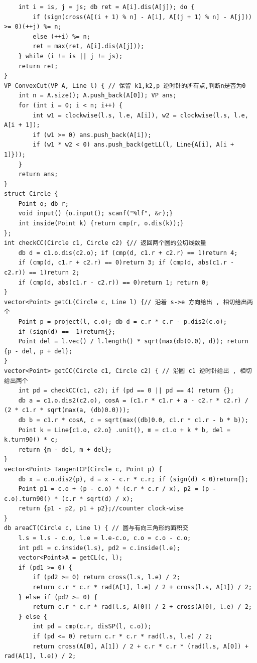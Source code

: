 \documentclass[twoside]{article}
\begin{document}
\begin{lstlisting}
    int i = is, j = js; db ret = A[i].dis(A[j]); do {
        if (sign(cross(A[(i + 1) % n] - A[i], A[(j + 1) % n] - A[j])) >= 0)(++j) %= n;
        else (++i) %= n;
        ret = max(ret, A[i].dis(A[j]));
    } while (i != is || j != js);
    return ret;
}
VP ConvexCut(VP A, Line l) { // 保留 k1,k2,p 逆时针的所有点,判断n是否为0
    int n = A.size(); A.push_back(A[0]); VP ans;
    for (int i = 0; i < n; i++) {
        int w1 = clockwise(l.s, l.e, A[i]), w2 = clockwise(l.s, l.e, A[i + 1]);
        if (w1 >= 0) ans.push_back(A[i]);
        if (w1 * w2 < 0) ans.push_back(getLL(l, Line{A[i], A[i + 1]}));
    }
    return ans;
}
struct Circle {
    Point o; db r;
    void input() {o.input(); scanf("%lf", &r);}
    int inside(Point k) {return cmp(r, o.dis(k));}
};
int checkCC(Circle c1, Circle c2) {// 返回两个圆的公切线数量
    db d = c1.o.dis(c2.o); if (cmp(d, c1.r + c2.r) == 1)return 4;
    if (cmp(d, c1.r + c2.r) == 0)return 3; if (cmp(d, abs(c1.r - c2.r)) == 1)return 2;
    if (cmp(d, abs(c1.r - c2.r)) == 0)return 1; return 0;
}
vector<Point> getCL(Circle c, Line l) {// 沿着 s->e 方向给出 , 相切给出两个
    Point p = project(l, c.o); db d = c.r * c.r - p.dis2(c.o);
    if (sign(d) == -1)return{};
    Point del = l.vec() / l.length() * sqrt(max(db(0.0), d)); return {p - del, p + del};
}
vector<Point> getCC(Circle c1, Circle c2) { // 沿圆 c1 逆时针给出 , 相切给出两个
    int pd = checkCC(c1, c2); if (pd == 0 || pd == 4) return {};
    db a = c1.o.dis2(c2.o), cosA = (c1.r * c1.r + a - c2.r * c2.r) / (2 * c1.r * sqrt(max(a, (db)0.0)));
    db b = c1.r * cosA, c = sqrt(max((db)0.0, c1.r * c1.r - b * b));
    Point k = Line{c1.o, c2.o} .unit(), m = c1.o + k * b, del = k.turn90() * c;
    return {m - del, m + del};
}
vector<Point> TangentCP(Circle c, Point p) {
    db x = c.o.dis2(p), d = x - c.r * c.r; if (sign(d) < 0)return{};
    Point p1 = c.o + (p - c.o) * (c.r * c.r / x), p2 = (p - c.o).turn90() * (c.r * sqrt(d) / x);
    return {p1 - p2, p1 + p2};//counter clock-wise
}
db areaCT(Circle c, Line l) { // 圆与有向三角形的面积交
    l.s = l.s - c.o, l.e = l.e-c.o, c.o = c.o - c.o;
    int pd1 = c.inside(l.s), pd2 = c.inside(l.e);
    vector<Point>A = getCL(c, l);
    if (pd1 >= 0) {
        if (pd2 >= 0) return cross(l.s, l.e) / 2;
        return c.r * c.r * rad(A[1], l.e) / 2 + cross(l.s, A[1]) / 2;
    } else if (pd2 >= 0) {
        return c.r * c.r * rad(l.s, A[0]) / 2 + cross(A[0], l.e) / 2;
    } else {
        int pd = cmp(c.r, disSP(l, c.o));
        if (pd <= 0) return c.r * c.r * rad(l.s, l.e) / 2;
        return cross(A[0], A[1]) / 2 + c.r * c.r * (rad(l.s, A[0]) + rad(A[1], l.e)) / 2;

\end{lstlisting}
\end{document}

